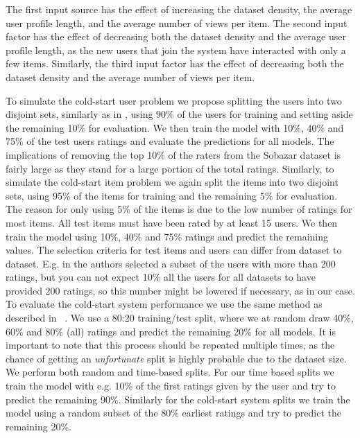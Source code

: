 The first input source has the effect of increasing the dataset density, the
average user profile length, and the average number of views per item. The
second input factor has the effect of decreasing both the dataset density and
the average user profile length, as the new users that join the system have
interacted with only a few items. Similarly, the third input factor has the
effect of decreasing both the dataset density and the average number of views
per item.

To simulate the cold-start user problem we propose splitting the users into two
disjoint sets, similarly as in \cite{Stern2009, Lam2008}, using 90\% of the
users for training and setting aside the remaining 10\% for evaluation. We then
train the model with 10\%, 40\% and 75\% of the test users ratings and evaluate
the predictions for all models. The implications of removing the top 10\% of the raters from the
Sobazar dataset is fairly large as they stand for a large portion of the total ratings.
Similarly, to simulate the cold-start item problem we again split the items into two
disjoint sets, using 95\% of the items for training and the remaining 5\% for
evaluation. The reason for only using 5\% of the items is due to the low number of
ratings for most items. All test items must have been rated by at least 15 users.
We then train the model using 10\%, 40\% and 75\% ratings and predict the remaining values. The
selection criteria for test items and users can differ from dataset to dataset.
E.g. in \cite{Rashid2002, Rashid2008} the authors selected a subset of the
users with more than 200 ratings, but you can not expect 10\% all the users for
all datasets to have provided 200 ratings, so this number might be lowered if
necessary, as in our case. To evaluate the cold-start system performance we use the same method as
described in ~\cite{Agarwal2009}. We use a 80:20 training/test split, where
we at random draw 40\%, 60\% and 80\% (all) ratings and predict the
remaining 20\% for all models. It is important to note that this process should be repeated multiple times, as
the chance of getting an \emph{unfortunate} split is highly probable due to the
dataset size. We perform both random and time-based splits. For our time based
splits we train the model with e.g. 10\% of the first ratings given by the
user and try to predict the remaining 90\%. Similarly for the cold-start
system splits we train the model using a random subset of the 80\%
earliest ratings and try to predict the remaining 20\%.
